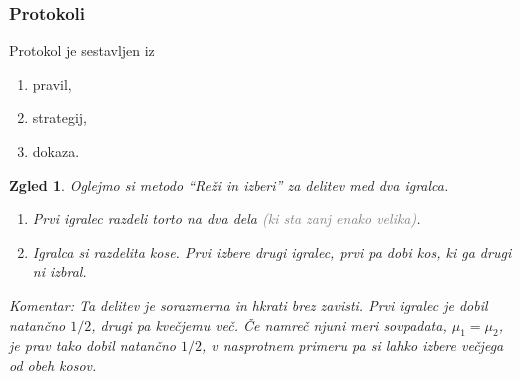 \documentclass{beamer}
\newtheorem{zgled}{Zgled}
\begin{document}
\begin{frame}

\frametitle{Protokoli}

Protokol je sestavljen iz

\begin{enumerate}
\item pravil,
\item strategij,
\item dokaza.
\end{enumerate}

\begin{zgled}

Oglejmo si metodo ``Reži in izberi'' za delitev med dva igralca.
\begin{enumerate}

\item Prvi igralec razdeli torto na dva dela \textcolor{gray}{(ki sta zanj enako velika)}.

\item Igralca si razdelita kose. Prvi izbere drugi igralec, prvi pa dobi kos, ki ga drugi ni izbral.

\end{enumerate}

{\em Komentar:} Ta delitev je {\em sorazmerna\/} in hkrati {\em brez zavisti\/}. Prvi igralec je dobil natančno $1/2$, drugi pa kvečjemu več. Če namreč njuni meri sovpadata, $\mu_1 = \mu_2$, je prav tako dobil natančno $1/2$, v nasprotnem primeru pa si lahko izbere večjega od obeh kosov.


\end{zgled}

\end{frame}
\end{document}
